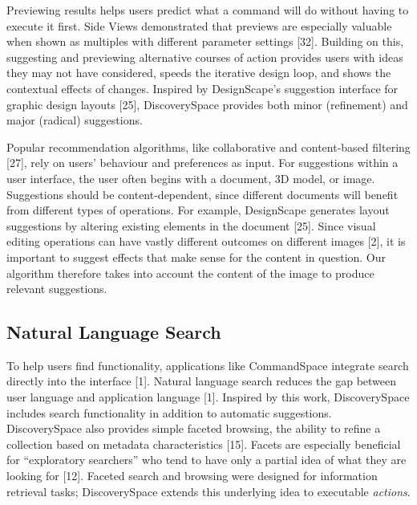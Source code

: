 Previewing results helps users predict what a command will do without having to execute it first. Side Views demonstrated that previews are especially valuable when shown as multiples with different parameter settings [32]. Building on this, suggesting and previewing alternative courses of action provides users with ideas they may not have considered, speeds the iterative design loop, and shows the contextual effects of changes. Inspired by DesignScape's suggestion interface for graphic design layouts [25], Discovery\-Space provides both minor (refinement) and major (radical) suggestions.

Popular recommendation algorithms, like collaborative and content-based filtering [27], rely on users' behaviour and preferences as input. For suggestions within a user interface, the user often begins with a document, 3D model, or image. Suggestions should be content-dependent, since different documents will benefit from different types of operations. For example, DesignScape generates layout suggestions by altering existing elements in the document [25]. Since visual editing operations can have vastly different outcomes on different images [2], it is important to suggest effects that make sense for the content in question. Our algorithm therefore takes into account the content of the image to produce relevant suggestions.

\subsection{Natural Language Search}
To help users find functionality, applications like CommandSpace integrate search directly into the interface [1]. Natural language search reduces the gap between user language and application language [1]. Inspired by this work, Discovery\-Space includes search functionality in addition to automatic suggestions. Discovery\-Space also provides simple faceted browsing, the ability to refine a collection based on metadata characteristics [15]. Facets are especially beneficial for ``exploratory searchers'' who tend to have only a partial idea of what they are looking for [12]. Faceted search and browsing were designed for information retrieval tasks; Discovery\-Space extends this underlying idea to executable \textit{actions}.
